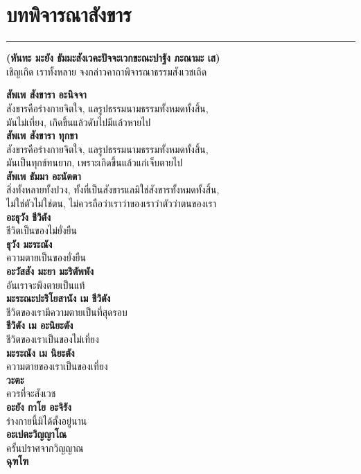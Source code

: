 \documentclass[12pt]{article}
\begin{document}
\section{บทพิจารณาสังขาร }
\hrule
\begin{center}
\textbf{ (หันทะ มะยัง ธัมมะสังเวคะปัจจะเวกขะณะปาฐัง ภะณามะ เส)\\}
เชิญเถิด เราทั้งหลาย จงกล่าวคาถาพิจารณาธรรมสังเวชเถิด
\end{center}
\textbf{สัพเพ สังขารา อะนิจจา\\}
\indent สังขารคือร่างกายจิตใจ, แลรูปธรรมนามธรรมทั้งหมดทั้งสิ้น,\\
\indent มันไม่เที่ยง, เกิดขึ้นแล้วดับไปมีแล้วหายไป\\
\textbf{สัพเพ สังขารา ทุกขา\\}
\indent สังขารคือร่างกายจิตใจ, แลรูปธรรมนามธรรมทั้งหมดทั้งสิ้น,\\
\indent มันเป็นทุกข์ทนยาก, เพราะเกิดขึ้นแล้วแก่เจ็บตายไป\\
\textbf{สัพเพ ธัมมา อะนัตตา\\}
\indent สิ่งทั้งหลายทั้งปวง, ทั้งที่เป็นสังขารแลมิใช่สังขารทั้งหมดทั้งสิ้น,\\
\indent ไม่ใช่ตัวไม่ใช่ตน, ไม่ควรถือว่าเราว่าของเราว่าตัวว่าตนของเรา\\
\textbf{อะธุวัง ชีวิตัง\\}
\indent ชีวิตเป็นของไม่ยั่งยืน\\
\textbf{ธุวัง มะระณัง\\}
\indent ความตายเป็นของยั่งยืน\\
\textbf{อะวัสสัง มะยา มะริตัพพัง\\}
\indent อันเราจะพึงตายเป็นแท้\\
\textbf{มะระณะปะริโยสานัง เม ชีวิตัง\\}
\indent ชีวิตของเรามีความตายเป็นที่สุดรอบ\\
\textbf{ชีวิตัง เม อะนิยะตัง\\}
\indent ชีวิตของเราเป็นของไม่เที่ยง\\
\textbf{มะระณัง เม นิยะตัง\\}
\indent ความตายของเราเป็นของเที่ยง\\
\textbf{วะตะ\\}
\indent ควรที่จะสังเวช\\
\textbf{อะยัง กาโย อะจิรัง\\}
\indent ร่างกายนี้มิได้ตั้งอยู่นาน\\
\textbf{อะเปตะวิญญาโณ\\}
\indent ครั้นปราศจากวิญญาณ\\
\textbf{ฉุฑโฑ\\}
\end{document}

